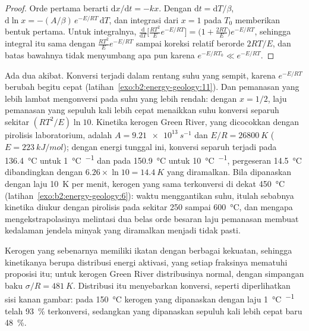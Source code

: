 \begin{proof}
Orde pertama berarti $\mathrm{d}x/\mathrm{d}t = -k x$. Dengan $\mathrm{d}t = \mathrm{d}T/\beta$,
$\mathrm{d}\ln x = -(A/\beta)\,e^{-E/RT}\,\mathrm{d}T$, dan integrasi dari $x = 1$ pada $T_0$ memberikan
bentuk pertama. Untuk integralnya, $\frac{\mathrm{d}}{\mathrm{d}T}\bigl[\frac{RT^2}{E}e^{-E/RT}\bigr]
= \bigl(1 + \frac{2RT}{E}\bigr)e^{-E/RT}$, sehingga integral itu sama dengan $\frac{RT^2}{E}e^{-E/RT}$ sampai
koreksi relatif berorde $2RT/E$, dan batas bawahnya tidak menyumbang apa pun karena $e^{-E/RT_0} \ll
e^{-E/RT}$.
\end{proof}

Ada dua akibat. Konversi terjadi dalam rentang suhu yang sempit, karena
$e^{-E/RT}$ berubah begitu cepat (latihan~\ref{exo:b2:energy-geology:11}). Dan pemanasan yang lebih lambat mengonversi
pada suhu yang lebih rendah: dengan $x = 1/2$, laju pemanasan yang sepuluh kali lebih cepat menaikkan suhu
konversi separuh sekitar $(RT^2/E)\ln 10$. Kinetika kerogen Green River, yang dicocokkan dengan
pirolisis laboratorium, adalah $A = \qty{9.21e13}{s^{-1}}$ dan $E/R = \qty{26800}{K}$ ($E =
\qty{223}{kJ/mol}$); dengan energi tunggal ini, konversi separuh terjadi pada \qty{136.4}{\celsius} untuk
\qty{1}{\celsius\per\Ma} dan pada \qty{150.9}{\celsius} untuk \qty{10}{\celsius\per\Ma}, pergeseran
\qty{14.5}{\celsius} dibandingkan dengan $6.26 \times \ln 10 = \qty{14.4}{K}$ yang diramalkan. Bila dipanaskan dengan laju
\qty{10}{K} per menit, kerogen yang sama terkonversi di dekat \qty{450}{\celsius}
(latihan~\ref{exo:b2:energy-geology:6}): waktu menggantikan suhu, itulah sebabnya kinetika
diukur dengan pirolisis pada sekitar 250 sampai \qty{600}{\celsius}, dan mengapa mengekstrapolasinya melintasi dua belas
orde besaran laju pemanasan membuat kedalaman jendela minyak yang diramalkan menjadi tidak pasti.

Kerogen yang sebenarnya memiliki ikatan dengan berbagai kekuatan, sehingga kinetikanya berupa distribusi energi
aktivasi, yang setiap fraksinya mematuhi proposisi itu; untuk kerogen Green River distribusinya
normal, dengan simpangan baku $\sigma/R = \qty{481}{K}$. Distribusi itu menyebarkan
konversi, seperti diperlihatkan sisi kanan gambar: pada \qty{150}{\celsius} kerogen yang dipanaskan dengan laju
\qty{1}{\celsius\per\Ma} telah \qty{93}{\percent} terkonversi, sedangkan yang dipanaskan sepuluh kali lebih cepat baru
\qty{48}{\percent}.

